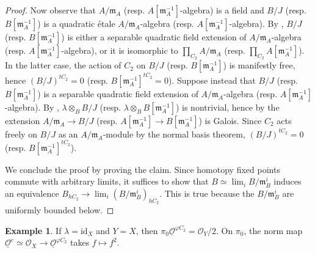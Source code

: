 \documentclass{article}
\theoremstyle{definition}
\newtheorem{example}[theorem]{Example}
\newcommand{\Lucy}[1]{\todo[color=cyan!30]{\footnotesize L: #1}}
\begin{document}
\begin{proof}
    Now observe that $ A/\mathfrak{m}_A $ (resp. $ A[\mathfrak{m}_A^{-1}] $-algebra) is a field and $ B/J $ (resp. $ B[\mathfrak{m}_A^{-1}] $) is a quadratic étale $ A/\mathfrak{m}_A $-algebra (resp. $ A[\mathfrak{m}_A^{-1}] $-algebra). 
    By \cite[Proposition 3.4(ii)]{azumaya_involution}, $ B/J $ (resp. $ B[\mathfrak{m}_A^{-1}] $) is either a separable quadratic field extension of $ A/\mathfrak{m}_A $-algebra (resp. $ A[\mathfrak{m}_A^{-1}] $-algebra), or it is isomorphic to $ \prod_{C_2} A/\mathfrak{m}_A $ (resp. $ \prod_{C_2} A[\mathfrak{m}_A^{-1}] $). 
    In the latter case, the action of $ C_2 $ on $ B/J $ (resp. $ B[\mathfrak{m}_A^{-1}] $) is manifestly free, hence $ (B/J)^{tC_2} = 0 $ (resp. $ B[\mathfrak{m}_A^{-1}]^{tC_2} = 0 $). 
    Suppose instead that $ B/J $ (resp. $ B[\mathfrak{m}_A^{-1}] $) is a separable quadratic field extension of $ A/\mathfrak{m}_A $-algebra (resp. $ A[\mathfrak{m}_A^{-1}] $-algebra). 
    By \cite[Proposition 3.4(ii)]{azumaya_involution}, $ \lambda \otimes_{B} B/J $ (resp. $ \lambda \otimes_B B[\mathfrak{m}_A^{-1}] $) is nontrivial, hence by \cite[Lemma 9.21.2, Tag 09DU]{stacks} the extension $ A/\mathfrak{m}_A \to B/J $ (resp. $ A[\mathfrak{m}_A^{-1}] \to B[\mathfrak{m}_A^{-1}] $) is Galois. 
    Since $ C_2 $ acts freely on $ B/J $ as an $ A/\mathfrak{m}_A $-module by the normal basis theorem, $ (B/J)^{tC_2} = 0 $ (resp. $ B[\mathfrak{m}_A^{-1}]^{tC_2} $).

    We conclude the proof by proving the claim. 
    Since homotopy fixed points commute with arbitrary limits, it suffices to show that $ B \simeq \lim_i B/\mathfrak{m}_B^i $ induces an equivalence $ B_{hC_2} \to \lim_i \left(B/\mathfrak{m}_B^i\right)_{hC_2} $. 
    This is true because the $ B/\mathfrak{m}_B^i $ are uniformly bounded below. \Lucy{compare \cite[Remark 2.8]{MR4280864}.}      
\end{proof}  
\begin{example}
    If $ \lambda = \mathrm{id}_X $ and $ Y = X $, then $ \pi_0 \underline{\mathcal{O}}^{\varphi C_2} = \mathcal{O}_Y /2 $. 
    On $ \pi_0 $, the norm map $ \underline{\mathcal{O}}^e \simeq \mathcal{O}_X \to \underline{\mathcal{O}}^{\varphi C_2} $ takes $ f \mapsto f^2 $. 
\end{example}
\end{document}

